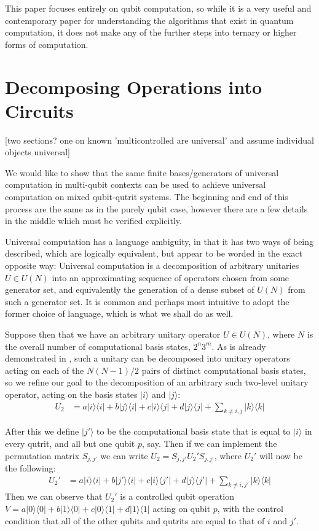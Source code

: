 \documentclass[]{article}
\newcommand{\bra}[1]{\langle #1 |}
\newcommand{\ket}[1]{| #1 \rangle}
\begin{document}
This paper focuses entirely on qubit computation, so while it is a very useful and contemporary paper for understanding the algorithms that exist in quantum computation, it does not make any of the further steps into ternary or higher forms of computation.

\section{Decomposing Operations into Circuits}
[two sections? one on known 'multicontrolled are universal' and assume individual objects universal]

We would like to show that the same finite bases/generators of universal computation in multi-qubit contexts can be used to achieve universal computation on mixed qubit-qutrit systems. The beginning and end of this process are the same as in the purely qubit case, however there are a few details in the middle which  must be verified explicitly.

Universal computation has a language ambiguity, in that it has two ways of being described, which are logically equivalent, but appear to be worded in the exact opposite way: Universal computation is a decomposition of arbitrary unitaries $U \in U(N)$ into an approximating sequence of operators chosen from some generator set, and equivalently the generation of a dense subset of $U(N)$ from such a generator set. It is common and perhaps most intuitive to adopt the former choice of language, which is what we shall do as well.

Suppose then that we have an arbitrary unitary operator $U \in U(N)$, where $N$ is the overall number of computational basis states, $2^n3^m$. As is already demonstrated in \cite{textbook}, such a unitary can be decomposed into unitary operators acting on each of the $N(N-1)/2$ pairs of distinct computational basis states, so we refine our goal to the decomposition of an arbitrary such two-level unitary operator, acting on the basis states $\ket{i}$ and $\ket{j}$:
\begin{align*}
U_2 &= a\ket{i}\bra{i} + b\ket{j}\bra{i} + c\ket{i}\bra{j} + d\ket{j}\bra{j} + \sum_{k \neq i, j} \ket{k}\bra{k}
\end{align*}

After this we define $\ket{j'}$ to be the computational basis state that is equal to $\ket{i}$ in every qutrit, and all but one qubit $p$, say. Then if we can implement the permutation matrix $S_{j,j'}$ we can write $U_2 = S_{j,j'}U_2'S_{j,j'}$, where $U_2'$ will now be the following:
\begin{align*}
U_2' &= a\ket{i}\bra{i} + b\ket{j'}\bra{i} + c\ket{i}\bra{j'} + d\ket{j}\bra{j'} + \sum_{k \neq i, j'} \ket{k}\bra{k}
\end{align*}
Then we can observe that $U_2'$ is a controlled qubit operation $V = a\ket{0}\bra{0} + b\ket{1}\bra{0} + c\ket{0}\bra{1} + d\ket{1}\bra{1}$ acting on qubit $p$, with the control condition that all of the other qubits and qutrits are equal to that of $i$ and $j'$.
\end{document}
